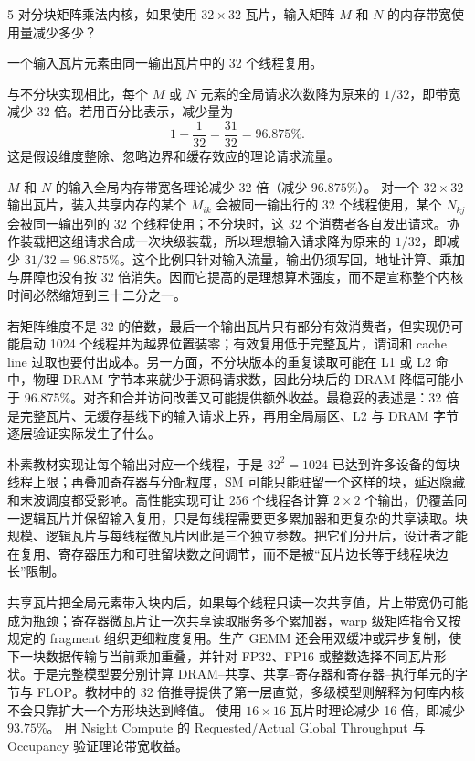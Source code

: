 \begin{solutionexercise}{5}
\problemheading 对分块矩阵乘法内核，如果使用 $32\times32$ 瓦片，输入矩阵 $M$ 和 $N$
的内存带宽使用量减少多少？

\approachheading 一个输入瓦片元素由同一输出瓦片中的 32 个线程复用。

\answerheading 与不分块实现相比，每个 $M$ 或 $N$ 元素的全局请求次数降为原来的
$1/32$，即带宽减少 32 倍。若用百分比表示，减少量为
\[
 1-\frac1{32}=\frac{31}{32}=96.875\%.
\]
这是假设维度整除、忽略边界和缓存效应的理论请求流量。

\conclusionheading $M$ 和 $N$ 的输入全局内存带宽各理论减少 32 倍（减少
$96.875\%$）。
\discussionheading
{}
对一个 $32\times32$ 输出瓦片，装入共享内存的某个 $M_{ik}$ 会被同一输出行的 32 个线程使用，某个 $N_{kj}$ 会被同一输出列的 32 个线程使用；不分块时，这 32 个消费者各自发出请求。协作装载把这组请求合成一次块级装载，所以理想输入请求降为原来的 $1/32$，即减少 $31/32=96.875\%$。这个比例只针对输入流量，输出仍须写回，地址计算、乘加与屏障也没有按 32 倍消失。因而它提高的是理想算术强度，而不是宣称整个内核时间必然缩短到三十二分之一。

若矩阵维度不是 32 的倍数，最后一个输出瓦片只有部分有效消费者，但实现仍可能启动 1024 个线程并为越界位置装零；有效复用低于完整瓦片，谓词和 cache line 过取也要付出成本。另一方面，不分块版本的重复读取可能在 L1 或 L2 命中，物理 DRAM 字节本来就少于源码请求数，因此分块后的 DRAM 降幅可能小于 96.875\%。对齐和合并访问改善又可能提供额外收益。最稳妥的表述是：32 倍是完整瓦片、无缓存基线下的输入请求上界，再用全局扇区、L2 与 DRAM 字节逐层验证实际发生了什么。

朴素教材实现让每个输出对应一个线程，于是 $32^2=1024$ 已达到许多设备的每块线程上限；再叠加寄存器与分配粒度，SM 可能只能驻留一个这样的块，延迟隐藏和末波调度都受影响。高性能实现可让 256 个线程各计算 $2\times2$ 个输出，仍覆盖同一逻辑瓦片并保留输入复用，只是每线程需要更多累加器和更复杂的共享读取。块规模、逻辑瓦片与每线程微瓦片因此是三个独立参数。把它们分开后，设计者才能在复用、寄存器压力和可驻留块数之间调节，而不是被“瓦片边长等于线程块边长”限制。

共享瓦片把全局元素带入块内后，如果每个线程只读一次共享值，片上带宽仍可能成为瓶颈；寄存器微瓦片让一次共享读取服务多个累加器，warp 级矩阵指令又按规定的 fragment 组织更细粒度复用。生产 GEMM 还会用双缓冲或异步复制，使下一块数据传输与当前乘加重叠，并针对 FP32、FP16 或整数选择不同瓦片形状。于是完整模型要分别计算 DRAM--共享、共享--寄存器和寄存器--执行单元的字节与 FLOP。教材中的 32 倍推导提供了第一层直觉，多级模型则解释为何库内核不会只靠扩大一个方形块达到峰值。
\variantheading 使用 $16\times16$ 瓦片时理论减少 16 倍，即减少 $93.75\%$。
\practiceheading 用 Nsight Compute 的 Requested/Actual Global Throughput 与 Occupancy 验证理论带宽收益。
\end{solutionexercise}

